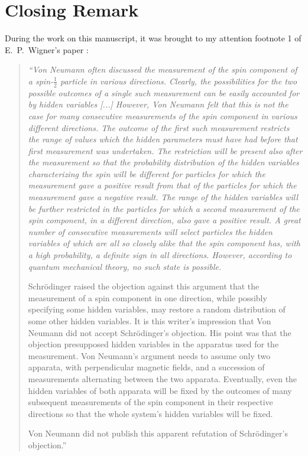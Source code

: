 \documentclass{svjour2}                    %
\begin{document}
\section{Closing Remark}

During the work on this manuscript, it was brought to my attention 
footnote 1 of E.~P.~Wigner's paper \cite{Wigner:1976ga}:
\begin{quote}
{\it ``Von Neumann often discussed the measurement of the spin component
of a spin-$\frac12$ particle in various directions. Clearly,
the possibilities for the two possible outcomes
of a single such measurement can be easily accounted for
by hidden variables [...] However, Von Neumann felt that this is
not the case for many consecutive measurements of the spin component
in various different directions. The outcome of the first such
measurement restricts the range of values which the hidden parameters
must have had before that first measurement was undertaken. The
restriction will be present also after the measurement so that the
probability distribution of the hidden variables characterizing the spin will
be different for particles for which the measurement gave a positive
result from that of the particles for which the measurement gave a
negative result. The range of the hidden variables will be
further restricted in the particles for which a second measurement
of the spin component, in a different direction, also gave a
positive result. A great number of consecutive measurements will
select particles the hidden variables of which are all so
closely alike that the spin component has, with a high probability,
a definite sign in all directions. However, according to quantum
mechanical theory, no such state is possible. 

Schr\"odinger
raised the objection against this argument that the measurement
of a spin component in one direction, while possibly specifying
some hidden variables, may restore a random distribution of some other
hidden variables. It is this writer's impression that Von Neumann did not
accept Schr\"odinger's objection. His point was that the objection
presupposed hidden variables in the apparatus used for the 
measurement. Von Neumann's argument needs to assume only two
apparata, with perpendicular magnetic fields, and a succession of
measurements alternating between the two apparata. Eventually, even
the hidden variables of both apparata will be fixed by the outcomes
of many subsequent measurements of the spin component in their respective
directions so that the whole system's hidden variables will be fixed.

Von Neumann did not publish this apparent refutation of Schr\"odinger's
objection.''}
\end{quote}
\end{document}

